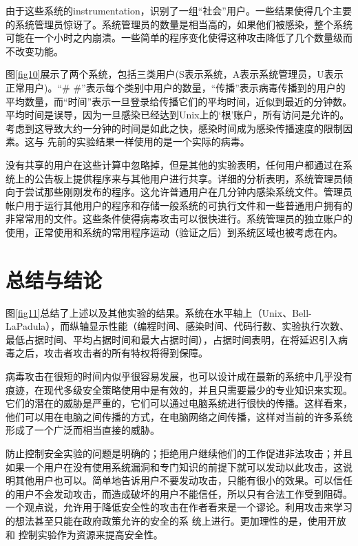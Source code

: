 由于这些系统的instrumentation，识别了一组“社会”用户。一些结果使得几个主要的系统管理员惊讶了。系统管理员的数量是相当高的，如果他们被感染，整个系统可能在一个小时之内崩溃。一些简单的程序变化使得这种攻击降低了几个数量级而不改变功能。


图\ref{fig10}展示了两个系统，包括三类用户(S表示系统，A表示系统管理员，U表示正常用户)。“\# \#”表示每个类别中用户的数量，“传播”表示病毒传播到的用户的平均数量，而“时间”表示一旦登录给传播它们的平均时间，近似到最近的分钟数。平均时间是误导，因为一旦感染已经达到Unix上的‘根’账户，所有访问是允许的。考虑到这导致大约一分钟的时间是如此之快，感染时间成为感染传播速度的限制因素。这与
先前的实验结果一样使用的是一个实际的病毒。

没有共享的用户在这些计算中忽略掉，但是其他的实验表明，任何用户都通过在系统上的公告板上提供程序来与其他用户进行共享。详细的分析表明，系统管理员倾向于尝试那些刚刚发布的程序。这允许普通用户在几分钟内感染系统文件。管理员帐户用于运行其他用户的程序和存储一般系统的可执行文件和一些普通用户拥有的非常常用的文件。这些条件使得病毒攻击可以很快进行。系统管理员的独立账户的使用，正常使用和系统的常用程序运动（验证之后）到系统区域也被考虑在内。

\section{总结与结论}

图\ref{fig11}总结了上述以及其他实验的结果。系统在水平轴上（Unix、Bell-LaPadula），而纵轴显示性能（编程时间、感染时间、代码行数、实验执行次数、最低占据时间、平均占据时间和最大占据时间），占据时间表明，在将延迟引入病毒之后，攻击者攻击者的所有特权将得到保障。


病毒攻击在很短的时间内似乎很容易发展，也可以设计成在最新的系统中几乎没有痕迹，在现代多级安全策略使用中是有效的，并且只需要最少的专业知识来实现。它们的潜在的威胁是严重的，它们可以通过电脑系统进行很快的传播。这样看来，他们可以用在电脑之间传播的方式，在电脑网络之间传播，这样对当前的许多系统形成了一个广泛而相当直接的威胁。


防止控制安全实验的问题是明确的；拒绝用户继续他们的工作促进非法攻击；并且如果一个用户在没有使用系统漏洞和专门知识的前提下就可以发动以此攻击，这说明其他用户也可以。简单地告诉用户不要发动攻击，只能有很小的效果。可以信任的用户不会发动攻击，而造成破坏的用户不能信任，所以只有合法工作受到阻碍。一个观点说，允许用于降低安全性的攻击在作者看来是一个谬论。利用攻击来学习的想法甚至只能在政府政策允许的安全的系
统上进行。更加理性的是，使用开放和
控制实验作为资源来提高安全性。


